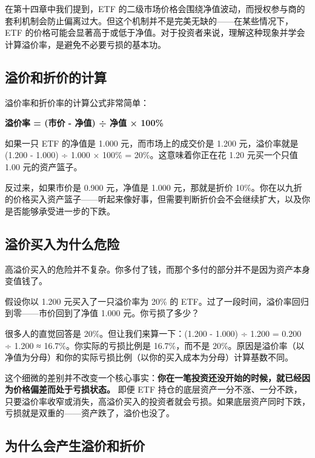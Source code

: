 \documentclass[a4paper,11pt,oneside,fontset=none,UTF8,zihao=-4]{ctexbook}
\begin{document}
在第十四章中我们提到，ETF
的二级市场价格会围绕净值波动，而授权参与商的套利机制会防止偏离过大。但这个机制并不是完美无缺的------在某些情况下，ETF
的价格可能会显著高于或低于净值。对于投资者来说，理解这种现象并学会计算溢价率，是避免不必要亏损的基本功。

\subsection{溢价和折价的计算}\label{ux6ea2ux4ef7ux548cux6298ux4ef7ux7684ux8ba1ux7b97}

溢价率和折价率的计算公式非常简单：

\textbf{溢价率 = (市价 - 净值) ÷ 净值 × 100\%}

如果一只 ETF 的净值是 1.000 元，而市场上的成交价是 1.200 元，溢价率就是
(1.200 - 1.000) ÷ 1.000 × 100\% = 20\%。这意味着你正在花 1.20
元买一个只值 1.00 元的资产篮子。

反过来，如果市价是 0.900 元，净值是 1.000 元，那就是折价
10\%。你在以九折的价格买入资产篮子------听起来像好事，但需要判断折价会不会继续扩大，以及你是否能够承受进一步的下跌。

\subsection{溢价买入为什么危险}\label{ux6ea2ux4ef7ux4e70ux5165ux4e3aux4ec0ux4e48ux5371ux9669}

高溢价买入的危险并不复杂。你多付了钱，而那个多付的部分并不是因为资产本身变值钱了。

假设你以 1.200 元买入了一只溢价率为 20\% 的
ETF。过了一段时间，溢价率回归到零------市价回到了净值 1.000
元。你亏损了多少？

很多人的直觉回答是 20\%。但让我们来算一下：(1.200 - 1.000) ÷ 1.200 =
0.200 ÷ 1.200 ≈ 16.7\%。你实际的亏损比例是 16.7\%，而不是
20\%。原因是溢价率（以净值为分母）和你的实际亏损比例（以你的买入成本为分母）计算基数不同。

这个细微的差别并不改变一个核心事实：\textbf{你在一笔投资还没开始的时候，就已经因为价格偏差而处于亏损状态。}
即便 ETF
持仓的底层资产一分不涨、一分不跌，只要溢价率收窄或消失，高溢价买入的投资者就会亏损。如果底层资产同时下跌，亏损就是双重的------资产跌了，溢价也没了。

\subsection{为什么会产生溢价和折价}\label{ux4e3aux4ec0ux4e48ux4f1aux4ea7ux751fux6ea2ux4ef7ux548cux6298ux4ef7}
\end{document}
